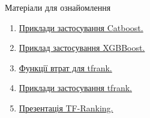 \documentclass[10pt]{beamer}
\begin{document}
\begin{frame}{Матеріали для ознайомлення}
\begin{enumerate}
    \item \href{https://github.com/catboost/tutorials/blob/master/ranking/ranking_tutorial.ipynb}{Приклади застосування Catboost.}
    \item \href{https://github.com/dmlc/xgboost/tree/master/demo/rank}{Приклад застосування XGBBoost.}
    \item \href{https://github.com/tensorflow/ranking/blob/master/tensorflow_ranking/python/losses.py}{Функції втрат для tfrank.}
    \item \href{https://github.com/tensorflow/ranking/tree/master/tensorflow_ranking/examples}{Приклади застосування tfrank.}
    \item \href{http://bendersky.github.io/res/TF-Ranking-ICTIR-2019.pdf}{Презентація TF-Ranking.}
\end{enumerate}
\end{frame}
\end{document}
